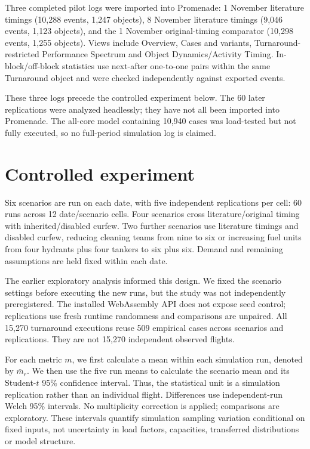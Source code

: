 Three completed pilot logs were imported into Promenade: 1 November literature timings (10,288 events, 1,247 objects), 8 November literature timings (9,046 events, 1,123 objects), and the 1 November original-timing comparator (10,298 events, 1,255 objects). Views include Overview, Cases and variants, Turnaround-restricted Performance Spectrum and Object Dynamics/Activity Timing. In-block/off-block statistics use next-after one-to-one pairs within the same Turnaround object and were checked independently against exported events.

These three logs precede the controlled experiment below. The 60 later replications were analyzed headlessly; they have not all been imported into Promenade. The all-core model containing 10,940 cases was load-tested but not fully executed, so no full-period simulation log is claimed.

\section{Controlled experiment}
Six scenarios are run on each date, with five independent replications per cell: 60 runs across 12 date/scenario cells. Four scenarios cross literature/original timing with inherited/disabled curfew. Two further scenarios use literature timings and disabled curfew, reducing cleaning teams from nine to six or increasing fuel units from four hydrants plus four tankers to six plus six. Demand and remaining assumptions are held fixed within each date.

The earlier exploratory analysis informed this design. We fixed the scenario settings before executing the new runs, but the study was not independently preregistered. The installed WebAssembly API does not expose seed control; replications use fresh runtime randomness and comparisons are unpaired. All 15,270 turnaround executions reuse 509 empirical cases across scenarios and replications. They are not 15,270 independent observed flights.

For each metric $m$, we first calculate a mean within each simulation run, denoted by $\bar m_r$. We then use the five run means to calculate the scenario mean and its Student-$t$ 95\% confidence interval. Thus, the statistical unit is a simulation replication rather than an individual flight. Differences use independent-run Welch 95\% intervals. No multiplicity correction is applied; comparisons are exploratory. These intervals quantify simulation sampling variation conditional on fixed inputs, not uncertainty in load factors, capacities, transferred distributions or model structure.

